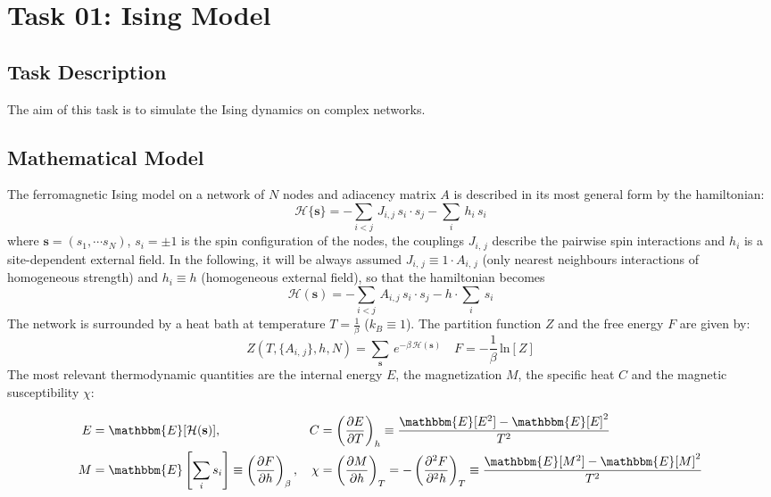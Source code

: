 \chapter{Task 01: Ising Model}
\section{Task Description}
The aim of this task is to simulate the Ising dynamics on complex networks.
\section{Mathematical Model}
The ferromagnetic Ising model on a network of $N$ nodes and adiacency matrix $A$ is described in its most general form by the hamiltonian:
\begin{equation*}
    \mathcal{H}\{\mathbf{s}\} = - \sum_{i < j}\, J_{i,j}\,s_i\cdot s_j - \sum_{i}\, h_i\,s_i
\end{equation*}
where $\mathbf{s} = (s_1, \cdots s_N)$, $s_i = \pm 1$ is the spin configuration of the nodes, the couplings $J_{i,\,j}$ describe the pairwise spin interactions and $h_i$ is a site-dependent external field.
In the following, it will be always assumed $J_{i,\,j} \equiv 1\cdot A_{i,\,j}$ (only nearest neighbours interactions of homogeneous strength) and $h_i \equiv h$ (homogeneous external field), so that the hamiltonian becomes
\begin{equation}
        \mathcal{H}(\mathbf{s}) = - \sum_{i < j}\, A_{i,j}\,s_i\cdot s_j - h\cdot \sum_{i}\,s_i
\end{equation}
The network is surrounded by a heat bath at temperature $T = \frac{1}{\beta} $ ($k_B \equiv 1$). The partition function $Z$ and the free energy $F$ are given by:
\begin{equation*}
    Z\left(T, \{A_{i,\,j}\}, h, N\right) = \sum_{\mathbf{s}}\, e^{-\beta\, \mathcal{H}(\mathbf{s})} \quad F = -\frac{1}{\beta}\, \text{ln}[Z]
\end{equation*}
The most relevant thermodynamic quantities are the internal energy $E$, the magnetization $M$, the specific heat $C$ and the magnetic susceptibility $\chi$:

\begin{align*}
E &= \mathbbm{E}[\mathcal{H}(\mathbf{s})], &
C &= \left( \frac{\partial E}{\partial T} \right)_{h} \equiv \frac{\mathbbm{E}[E^2] - \mathbbm{E}[E]^2}{T^2} \\
M &= \mathbbm{E}\left[\sum_{i} s_i \right] \equiv \left( \frac{\partial F}{\partial h} \right)_{\beta}, &
\chi &= \left( \frac{\partial M}{\partial h} \right)_{T} = -\left( \frac{\partial^2 F}{\partial^2 h} \right)_{T} \equiv \frac{\mathbbm{E}[M^2] - \mathbbm{E}[M]^2}{T^2}
\end{align*}


